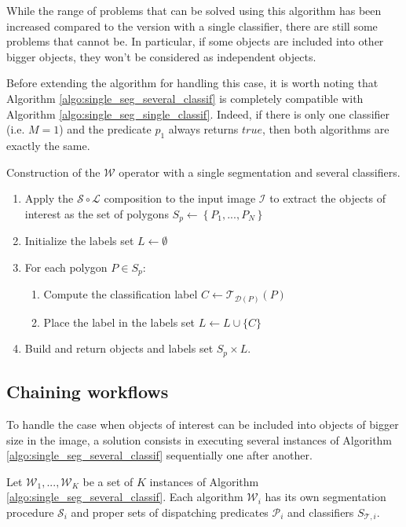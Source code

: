 While the range of problems that can be solved using this algorithm has been increased compared to the version with a single classifier, there are still some problems that cannot be. In particular, if some objects are included into other bigger objects, they won't be considered as independent objects. 

Before extending the algorithm for handling this case, it is worth noting that Algorithm \ref{algo:single_seg_several_classif} is completely compatible with Algorithm \ref{algo:single_seg_single_classif}. Indeed, if there is only one classifier (i.e. $M = 1$) and the predicate $p_1$ always returns $true$, then both algorithms are exactly the same. 

\begin{algorithm}\label{algo:single_seg_several_classif}
Construction of the $\mathcal{W}$ operator with a single segmentation and several classifiers. 
\begin{enumerate}
	\item Apply the $\mathcal{S} \circ \mathcal{L}$ composition to the input image $\mathcal{I}$ to extract the objects of interest as the set of polygons $S_p \leftarrow \left\{P_1, ..., P_N \right\}$
	\item Initialize the labels set $L \leftarrow \emptyset$
	\item For each polygon $P \in S_p$:
	\begin{enumerate}
		\item Compute the classification label $C \leftarrow \mathcal{T}_{\mathcal{D}(P)}(P)$
		\item Place the label in the labels set $L \leftarrow L \cup \{C\}$
	\end{enumerate}
	\item Build and return objects and labels set $S_p \times L$.
\end{enumerate}
\end{algorithm}

\subsection{Chaining workflows}

To handle the case when objects of interest can be included into objects of bigger size in the image, a solution consists in executing several instances of Algorithm \ref{algo:single_seg_several_classif} sequentially one after another. 

\begin{definition}\label{def:several_w_op}
	Let $\mathcal{W}_1, ..., \mathcal{W}_K$ be a set of $K$ instances of Algorithm \ref{algo:single_seg_several_classif}. Each algorithm $\mathcal{W}_i$ has its own segmentation procedure $\mathcal{S}_i$ and proper sets of dispatching predicates $\mathcal{P}_i$ and classifiers $S_{\mathcal{T},i}$.
\end{definition}

